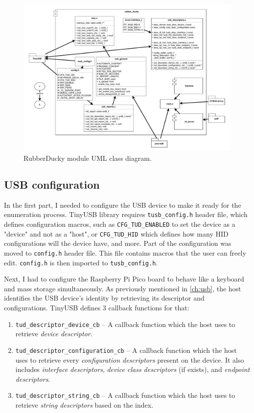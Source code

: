 \begin{figure}[ht]
    \includegraphics[width=\linewidth]{./obrazky-figures/rubber_ducky_module.pdf}
    \caption{RubberDucky module UML class diagram.}
    \label{fig:rubber_ducky_module}
\end{figure}

\subsection{USB configuration}
In the first part, I needed to configure the USB device to make it ready for the enumeration process. TinyUSB library requires \verb|tusb_config.h| header file, which defines configuration macros, such as \verb|CFG_TUD_ENABLED| to set the device as a "device" and not as a "host", or \verb|CFG_TUD_HID| which defines how many HID configurations will the device have, and more. Part of the configuration was moved to \verb|config.h| header file. This file contains macros that the user can freely edit. \verb|config.h| is then imported to \verb|tusb_config.h|.

Next, I had to configure the Raspberry Pi Pico board to behave like a keyboard and mass storage simultaneously. As previously mentioned in \autoref{ch:usb}, the host identifies the USB device's identity by retrieving its descriptor and configurations. TinyUSB defines 3 callback functions for that:
\begin{enumerate}
    \item \verb|tud_descriptor_device_cb| -- A callback function which the host uses to retrieve \emph{device descriptor}.
    \item \verb|tud_descriptor_configuration_cb| -- A callback function which the host uses to retrieve every \emph{configuration descriptors} present on the device. It also includes \emph{interface descriptors}, \emph{device class descriptors} (if exists), and \emph{endpoint descriptors}.
    \item \verb|tud_descriptor_string_cb| -- A callback function which the host uses to retrieve \emph{string descriptors} based on the index.
\end{enumerate}

